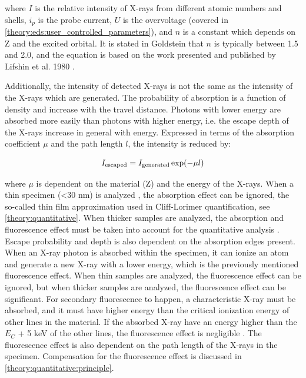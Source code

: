 where $I$ is the relative intensity of X-rays from different atomic numbers and shells, $i_p$ is the probe current, $U$ is the overvoltage (covered in \cref{theory:eds:user_controlled_parameters}), and $n$ is a constant which depends on Z and the excited orbital.
It is stated in Goldstein that $n$ is typically between 1.5 and 2.0, and the equation is based on the work presented and published by Lifshin et al. 1980 \cite{lifshin1980}.



Additionally, the intensity of detected X-rays is not the same as the intensity of the X-rays which are generated.
The probability of absorption is a function of density and increase with the travel distance.
Photons with lower energy are absorbed more easily than photons with higher energy, i.e. the escape depth of the X-rays increase in general with energy.
Expressed in terms of the absorption coefficient $\mu$ and the path length $l$, the intensity is reduced by:

\begin{equation}
    \label{eq:theory:xray_formation:escape}
    I_{\textnormal{escaped}} = I_{\textnormal{generated}} \exp(-\mu l)
\end{equation}

where $\mu$ is dependent on the material (Z) and the energy of the X-rays.
When a thin specimen (<30 nm) is analyzed \cite{watanabe_williams_zeta_2006}, the absorption effect can be ignored, the so-called thin film approximation used in Cliff-Lorimer quantification, see \cref{theory:quantitative}.
When thicker samples are analyzed, the absorption and fluorescence effect must be taken into account for the quantitative analysis \cite{goldstein_scanning_2018}.
Escape probability and depth is also dependent on the absorption edges present.
When an X-ray photon is absorbed within the specimen, it can ionize an atom and generate a new X-ray with a lower energy, which is the previously mentioned fluorescence effect.
When thin samples are analyzed, the fluorescence effect can be ignored, but when thicker samples are analyzed, the fluorescence effect can be significant.
For secondary fluorescence to happen, a characteristic X-ray must be absorbed, and it must have higher energy than the critical ionization energy of other lines in the material.
If the absorbed X-ray have an energy higher than the $E_C$ + 5 keV of the other lines, the fluorescence effect is negligible \cite[p. 306]{goldstein_scanning_2018}.
The fluorescence effect is also dependent on the path length of the X-rays in the specimen.
Compensation for the fluorescence effect is discussed in \cref{theory:quantitative:principle}.









